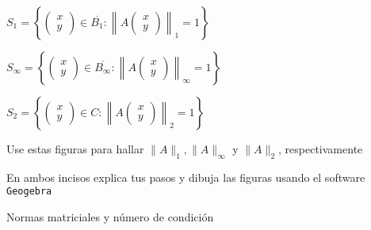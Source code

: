 \documentclass[addpoints,12pt]{exam}
\begin{document}
\begin{questions}
\begin{parts}
$S_1=\left\{
\begin{pmatrix} x \\ y \end{pmatrix}\in\overline{B_1}:
\left\|A\begin{pmatrix} x \\ y \end{pmatrix}\right\|_1=1\right\}$

$S_{\infty}=\left\{
\begin{pmatrix} x \\ y \end{pmatrix}\in\overline{B_{\infty}}:
\left\|A\begin{pmatrix} x \\ y \end{pmatrix}\right\|_{\infty}=1\right\}$

$S_2 =\left\{
\begin{pmatrix} x \\ y \end{pmatrix}\in C:
\left\|A\begin{pmatrix} x \\ y \end{pmatrix}\right\|_2=1\right\}$

Use estas figuras para hallar $\|A\|_1,\|A\|_{\infty}$ y $\|A\|_2$, 
respectivamente
\end{parts}
En ambos incisos explica tus pasos y dibuja las figuras usando el software
{\tt Geogebra}

\newpage

\question[2]
 Normas matriciales y número de condición
\end{questions}
\end{document}
